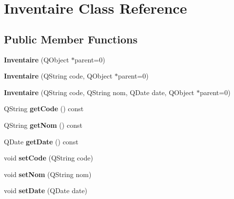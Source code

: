 \hypertarget{class_inventaire}{
\section{Inventaire Class Reference}
\label{class_inventaire}
}
\subsection*{Public Member Functions}
\begin{DoxyCompactItemize}
\item 
\hypertarget{class_inventaire_a0699dc0dc12b05ce13f2961da72d5502}{
{\bfseries Inventaire} (QObject $\ast$parent=0)}
\label{class_inventaire_a0699dc0dc12b05ce13f2961da72d5502}

\item 
\hypertarget{class_inventaire_a85297593d9f9e7c619a3b642c26e37f8}{
{\bfseries Inventaire} (QString code, QObject $\ast$parent=0)}
\label{class_inventaire_a85297593d9f9e7c619a3b642c26e37f8}

\item 
\hypertarget{class_inventaire_a96acba0f5cd94b713941d7a4e8d859f3}{
{\bfseries Inventaire} (QString code, QString nom, QDate date, QObject $\ast$parent=0)}
\label{class_inventaire_a96acba0f5cd94b713941d7a4e8d859f3}

\item 
\hypertarget{class_inventaire_a1cbccc9236ad06a4f94afdf2db148035}{
QString {\bfseries getCode} () const }
\label{class_inventaire_a1cbccc9236ad06a4f94afdf2db148035}

\item 
\hypertarget{class_inventaire_a65871bc4cc574eaf2e883e42e7a45a99}{
QString {\bfseries getNom} () const }
\label{class_inventaire_a65871bc4cc574eaf2e883e42e7a45a99}

\item 
\hypertarget{class_inventaire_a49cd84bfddb4b04b384ecd6ce193b2fd}{
QDate {\bfseries getDate} () const }
\label{class_inventaire_a49cd84bfddb4b04b384ecd6ce193b2fd}

\item 
\hypertarget{class_inventaire_a7891243bb6229045e5f2e015354ffa3a}{
void {\bfseries setCode} (QString code)}
\label{class_inventaire_a7891243bb6229045e5f2e015354ffa3a}

\item 
\hypertarget{class_inventaire_a0de81b001587b46e84ae0ddfe921b8e6}{
void {\bfseries setNom} (QString nom)}
\label{class_inventaire_a0de81b001587b46e84ae0ddfe921b8e6}

\item 
\hypertarget{class_inventaire_aad4911f7d6cd6bd799233e05f645c033}{
void {\bfseries setDate} (QDate date)}
\label{class_inventaire_aad4911f7d6cd6bd799233e05f645c033}

\end{DoxyCompactItemize}
